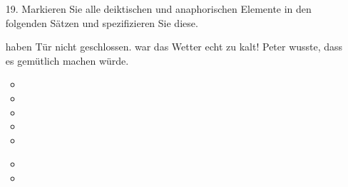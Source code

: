 \begin{frame}

\begin{itemize}
		\item[19.] Markieren Sie alle deiktischen und anaphorischen Elemente in den folgenden Sätzen und spezifizieren Sie diese.
	
	\eal
	\ex {} haben  Tür nicht geschlossen.
	\ex {} war  das Wetter echt zu kalt!
	\ex Peter wusste, dass  es   gemütlich machen würde. 
	\zl

\end{itemize}	
	
	\begin{minipage}[t]{0.35\textwidth}

	\begin{itemize}
		\item []
		
			\begin{itemize}
				 \item {}
				 \item {}
				 \item {}
				 \item {}
				 \item {} 
			\end{itemize}		

	\end{itemize}
	
	\end{minipage}
	\begin{minipage}[t]{0.60\textwidth}
	
	\begin{itemize}
		\item [] 
		
			\begin{itemize}
				\item {}
				\item {}
			\end{itemize}
		
	\end{itemize}

	\end{minipage}


\end{frame}

